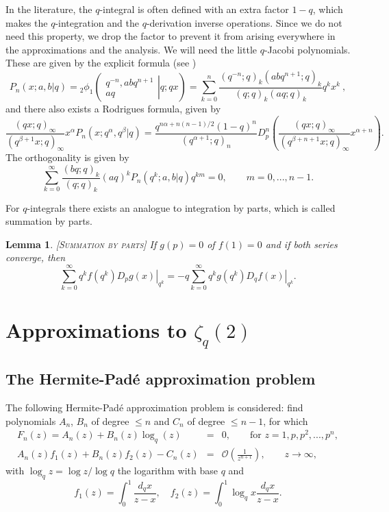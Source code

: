 \documentclass[12pt]{article}
\newtheorem{lemma}[theorem]{Lemma}
\numberwithin{equation}{section}
\begin{document}
In the literature, the $q$-integral is often defined with an extra
factor $1-q$, which makes the $q$-integration and the
$q$-derivation inverse operations.  Since we do not need this
property, we drop the factor to prevent it from arising everywhere
in the approximations and the analysis. We will need the little
$q$-Jacobi polynomials. These are given by the explicit formula
(see \cite{Koekoek})
\begin{equation}
 \label{qjacexp}
P_n(x;a,b|q)={}_2\phi_1\left( \left.\begin{array}{c}q^{-n},abq^{n+1} \\ aq \end{array} \right| q;qx \right)
  = \sum_{k=0}^n
  \frac{(q^{-n};q)_k (abq^{n+1};q)_k}{(q;q)_k(aq;q)_k}q^kx^k\ ,
\end{equation}
and there also exists a Rodrigues formula, given by
\begin{equation} \label{qjacrod}
\frac{(qx;q)_\infty}
{(q^{\beta+1}x;q)_\infty}x^\alpha
P_n\left(x;q^\alpha,q^\beta|q\right)
=\frac{q^{n\alpha+n(n-1)/2}(1-q)^n}{(q^{\alpha+1};q)_n}
D_p^n\left(\frac{(qx;q)_\infty}{(q^{\beta+n+1}x;q)_\infty}x^{\alpha+n}\right).
\end{equation}
The orthogonality is given by
\begin{equation}\label{orthojacobi}
\sum_{k=0}^\infty\frac{(bq;q)_k}{(q;q)_k}(aq)^kP_n\left(q^k;a,b|q\right)q^{km}
= 0, \qquad m=0,...,n-1.
\end{equation}

For $q$-integrals there exists an analogue to integration by
parts, which is called summation by parts.

\begin{lemma}\label{sbp}\textsc{[Summation by parts]}
If $g(p)=0$ of $f(1)=0$ and if both series converge, then
\[  \sum_{k=0}^\infty q^k \left. f(q^k)D_pg(x)\right|_{q^k}
 =-q\sum_{k=0}^\infty q^k \left. g(q^k)D_qf(x)\right|_{q^k}.\]
\end{lemma}

\section{Approximations to $\zeta_q(2)$}
\subsection{The Hermite-Pad\'{e} approximation problem}

The following Hermite-Pad\'{e} approximation problem is
considered: find polynomials $A_n$, $B_n$ of degree $\leq n$ and $C_n$
of degree $\leq n-1$, for which
\begin{eqnarray}
   \label{fnpl} F_n(z)=A_n(z)+B_n(z)\log_{q}(z) &=& 0, \qquad \textrm{for } z=1,p,p^2,...,p^n, \\
   \label{pade} A_n(z)f_1(z)+B_n(z)f_2(z)-C_n(z)&=& \mathcal{O}\left(\frac{1}{z^{n+1}}\right),
  \qquad z\rightarrow\infty,
\end{eqnarray}%
with $\log_q z = \log z/\log q$ the logarithm with base $q$ and
\[   f_1(z)=\int_0^1\frac{d_{q}x}{z-x}, \quad
     f_2(z)=\int_0^1\log_{q}x\frac{d_{q}x}{z-x}. \]
\end{document}
